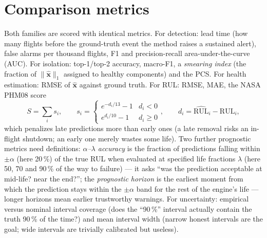 \section{Comparison metrics}

Both families are scored with identical metrics. For detection: lead time (how many flights
before the ground-truth event the method raises a sustained alert), false alarms per thousand
flights, F1 and precision-recall area-under-the-curve (AUC). For isolation: top-1/top-2 accuracy, macro-F1, a
\emph{smearing index} (the fraction of $\|\hat{\mathbf{x}}\|_1$ assigned to healthy components)
and the PCS. For health estimation: RMSE of $\hat{\mathbf{x}}$ against ground truth. For RUL:
RMSE, MAE, the NASA PHM08 score
\begin{equation}
  S=\sum_i s_i,\qquad
  s_i = \begin{cases} e^{-d_i/13}-1 & d_i<0\\ e^{d_i/10}-1 & d_i\geq 0\end{cases},
  \qquad d_i = \widehat{\mathrm{RUL}}_i - \mathrm{RUL}_i,
\end{equation}
which penalizes late predictions more than early ones (a late removal risks an in-flight
shutdown; an early one merely wastes some life). Two further prognostic metrics need
definitions: \emph{$\alpha$--$\lambda$ accuracy} is the fraction of predictions falling within
$\pm\alpha$ (here 20\,\%) of the true RUL when evaluated at specified life fractions
$\lambda$ (here 50, 70 and 90\,\% of the way to failure) --- it asks ``was the prediction
acceptable at mid-life? near the end?''; the \emph{prognostic horizon} is the earliest moment
from which the prediction stays within the $\pm\alpha$ band for the rest of the engine's life
--- longer horizons mean earlier trustworthy warnings. For uncertainty: empirical versus
nominal interval coverage (does the ``90\,\%'' interval actually contain the truth 90\,\% of
the time?) and mean interval width (narrow honest intervals are the goal; wide intervals are
trivially calibrated but useless).
